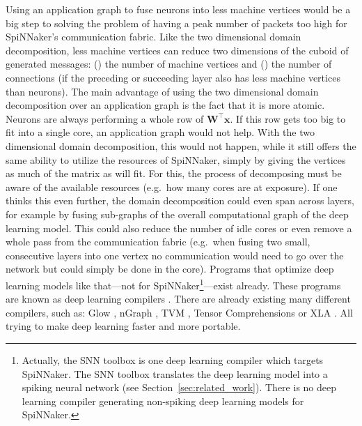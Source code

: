\documentclass[]{article}
\begin{document}
Using an application graph to fuse neurons into less machine vertices
would be a big step to solving the problem of having a peak number of
packets too high for SpiNNaker's communication fabric.
Like the two dimensional domain decomposition, less machine vertices
can reduce two dimensions of the cuboid of generated messages:
() the number of machine vertices and ()
the number of connections (if the preceding or succeeding layer also
has less machine vertices than neurons).
The main advantage of using the two dimensional domain decomposition
over an application graph is the fact that it is more atomic.
Neurons are always performing a whole row of
$\mathbf{W}^\top\mathbf{x}$.
If this row gets too big to fit into a single core, an application
graph would not help.
With the two dimensional domain decomposition, this would not happen,
while it still offers the same ability to utilize the resources of
SpiNNaker, simply by giving the vertices as much of the matrix as will
fit.
For this, the process of decomposing must be aware of the available
resources (e.g.\ how many cores are at exposure).
If one thinks this even further, the domain decomposition could even
span across layers, for example by fusing sub-graphs of the
overall computational graph of the deep learning model.
This could also reduce the number of idle cores or even remove
a whole pass from the communication fabric (e.g.\ when fusing two
small, consecutive layers into one vertex no communication would need
to go over the network but could simply be done in the core).
Programs that optimize deep learning models like that---not for
SpiNNaker\footnote{Actually, the SNN toolbox is one deep learning
  compiler which targets SpiNNaker.
  The SNN toolbox translates the deep learning model into a spiking
  neural network (see Section~\ref{sec:related_work}).
  There is no deep learning compiler generating non-spiking deep
  learning models for SpiNNaker.}---exist already.
These programs are known as deep learning compilers
\citep{li_et_al_2020}.
There are already existing many different compilers, such as:
Glow \citep{rotem_et_al_2018}, nGraph \citep{cyphers_et_al_2018},
TVM \citep{chen_et_al_2018}, Tensor Comprehensions
\citep{vasilache_et_al_2018} or XLA \citep{leary_et_al_2017}.
All trying to make deep learning faster and more portable.
\end{document}

